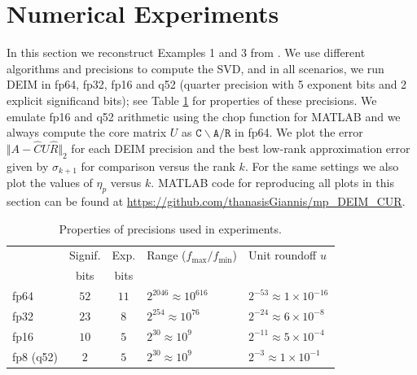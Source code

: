 \documentclass[12pt, a4paper]{article}
\theoremstyle{remark}
\begin{document}
\section{Numerical Experiments}
\label{sec:numexp}

In this section we reconstruct Examples 1 and 3 from \cite{sorensen2016deim}. We use different algorithms and precisions to compute the SVD, and in all scenarios, we run DEIM in fp64, fp32, fp16 and q52 (quarter precision with 5 exponent bits and 2 explicit significand bits); see Table \ref{tab:precs} for properties of these precisions. We emulate fp16 and q52  arithmetic using the chop function for MATLAB \cite{higham2019simulating} and we always compute the core matrix $U$ as $\texttt{C}\backslash \texttt{A} / \texttt{R}$ in fp64. We plot the error $\Vert A-\widehat{C}U\widehat{R}\Vert_2$ for each DEIM precision and the best low-rank approximation error given by $\sigma_{k+1}$ for comparison versus the rank $k$. For the same settings we also plot the values of $\widehat{\eta}_p$ versus $k$. MATLAB code for reproducing all plots in this section can be found at \url{https://github.com/thanasisGiannis/mp_DEIM_CUR}. \par 

  \begin{table}
    \centering
    \begin{tabular}{lccll}
        \toprule
        & Signif. & Exp. & Range  ($f_\mathrm{max}/f_\mathrm{min}$)    & Unit roundoff $u$ \\
        & bits &  bits   \\
        \midrule
        fp64          & $52$  & $11$ & $2^{2046}\approx10^{616}$  & $2^{-53} \approx1\times10^{-16}$ \\
        fp32         & $23$  & $8$  & $2^{254}\approx10^{76}$   & $2^{-24} \approx6\times10^{-8}$ \\
        fp16        & $10$  & $5$  & $2^{30}\approx10^{9}$    & $2^{-11} \approx5\times10^{-4}$ \\
        fp8 (q52)  & $2$   & $5$  & $2^{30}\approx10^{9}$    & $2^{-3}  \approx1\times10^{-1}$ \\
        \bottomrule
    \end{tabular}
   \caption{Properties of precisions used in experiments. \label{tab:precs}}
    \end{table}
\end{document}
